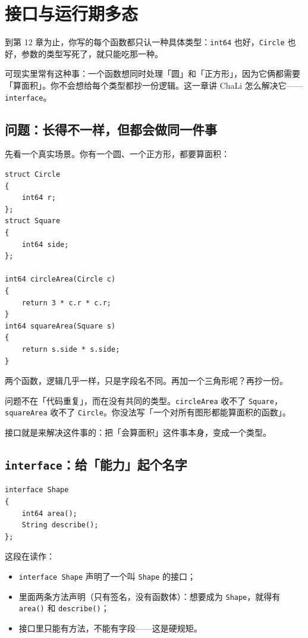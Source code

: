 \chapter{接口与运行期多态}
\label{ch:13}

到第 12 章为止，你写的每个函数都只认一种具体类型：\texttt{int64} 也好，\texttt{Circle} 也好，参数的类型写死了，就只能吃那一种。

可现实里常有这种事：一个函数想同时处理「圆」和「正方形」，因为它俩都需要「算面积」。你不会想给每个类型都抄一份逻辑。这一章讲 ChaLi 怎么解决它——\texttt{interface}。

\section{问题：长得不一样，但都会做同一件事}

先看一个真实场景。你有一个圆、一个正方形，都要算面积：

\par
\medskip
\begin{lstlisting}[style=chali]
struct Circle
{
    int64 r;
};
struct Square
{
    int64 side;
};

int64 circleArea(Circle c)
{
    return 3 * c.r * c.r;
}
int64 squareArea(Square s)
{
    return s.side * s.side;
}
\end{lstlisting}
\par
\medskip

两个函数，逻辑几乎一样，只是字段名不同。再加一个三角形呢？再抄一份。

问题不在「代码重复」，而在没有共同的类型。\texttt{circle\allowbreak{}Area} 收不了 \texttt{Square}，\texttt{square\allowbreak{}Area} 收不了 \texttt{Circle}。你没法写「一个对所有图形都能算面积的函数」。

接口就是来解决这件事的：把「会算面积」这件事本身，变成一个类型。

\section{\texttt{interface}：给「能力」起个名字}

\par
\medskip
\begin{lstlisting}[style=chali]
interface Shape
{
    int64 area();
    String describe();
};
\end{lstlisting}
\par
\medskip

这段在读作：

\begin{itemize}

\item \texttt{interface Shape} 声明了一个叫 \texttt{Shape} 的接口；

\item 里面两条方法声明（只有签名，没有函数体）：想要成为 \texttt{Shape}，就得有 \texttt{area(\allowbreak{})\allowbreak{}} 和 \texttt{describe(\allowbreak{})\allowbreak{}}；

\item 接口里只能有方法，不能有字段——这是硬规矩。

\end{itemize}

